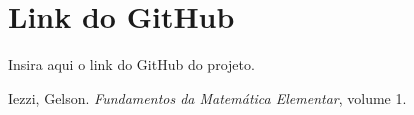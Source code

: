 \documentclass{article}
\begin{document}
\section{Link do GitHub}

Insira aqui o link do GitHub do projeto.
\newpage
\begin{thebibliography}{9}
  Iezzi, Gelson. \textit{Fundamentos da Matemática Elementar}, volume 1.
\end{thebibliography}
\end{document}
